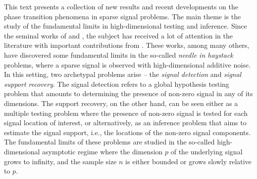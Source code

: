 
\preface



%
 


This text presents a collection of new results and recent developments on the phase transition phenomena in sparse signal problems.
The main theme is the study of the fundamental limits in high-dimensional testing and inference. Since the seminal works
of \cite{ingster1998minimax} and \cite{donoho2004higher}, the subject has received a lot of attention in the literature with important contributions
from \cite{ji2012ups,genovese2012comparison,jin2014optimality,arias2017distribution,butucea2018variable}.  These works, among many others, have discovered some fundamental limits in the so-called  {\em needle in haystack} problems, where a sparse signal is observed with high-dimensional additive noise.  In this setting, two archetypal  problems arise -- the {\em signal detection} and {\em signal support recovery}.  
The signal detection refers to a global hypothesis testing problem that amounts
to determining the presence of non-zero signal in any of its dimensions. 
The support recovery, on the other hand, can be seen either as a multiple testing problem where the presence of non-zero signal is tested for each signal location of interest, or alternatively,  as an inference problem that aims to estimate the signal support, i.e., the locations of the non-zero signal components.  The fundamental limits of these problems are studied in the so-called high-dimensional asymptotic regime where the dimension $p$ of the underlying signal grows to infinity, and the sample size $n$ is either bounded or grows slowly relative to $p$.   
  

